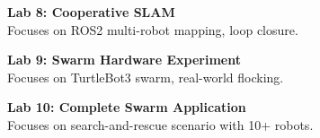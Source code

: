 \vspace{0.2cm}

\noindent\textbf{Lab 8: Cooperative SLAM} \\
Focuses on ROS2 multi-robot mapping, loop closure.

\vspace{0.2cm}

\noindent\textbf{Lab 9: Swarm Hardware Experiment} \\
Focuses on TurtleBot3 swarm, real-world flocking.

\vspace{0.2cm}

\noindent\textbf{Lab 10: Complete Swarm Application} \\
Focuses on search-and-rescue scenario with 10+ robots.

\vspace{0.2cm}

\newpage
{}

